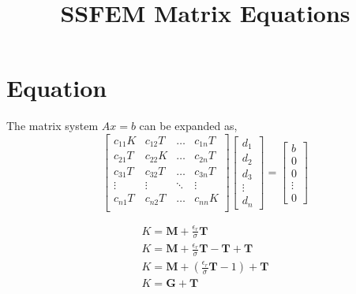 \documentclass[]{article}
\newcommand{\mat}[1]{\mathbf{#1}}
\begin{document}
 

\title{SSFEM Matrix Equations}
\maketitle

\section{Equation}
	The matrix system $Ax = b$ can be expanded as,
	\begin{equation}
		\begin{bmatrix}
			c_{11}K & c_{12}T & \ldots & c_{1n}T\\
			c_{21}T & c_{22}K & \ldots & c_{2n}T\\
			c_{31}T & c_{32}T & \ldots & c_{3n}T\\
			\vdots & \vdots  & \ddots & \vdots \\
			c_{n1}T & c_{n2}T & \ldots & c_{nn}K\\
		\end{bmatrix}
		\begin{bmatrix}
			d_1\\d_2\\d_3\\\vdots\\d_n
		\end{bmatrix}
		=
		\begin{bmatrix}
			b\\0\\0\\\vdots\\0
		\end{bmatrix}
	\end{equation}

	\begin{align}
	K = \mat{M} + \frac{\epsilon_r}{\sigma}\mat{T}\\
	K = \mat{M} + \frac{\epsilon_r}{\sigma}\mat{T} - \mat{T} + \mat{T}\\
	K = \mat{M} + \left(\frac{\epsilon_r}{\sigma}\mat{T}-1\right)+ \mat{T}\\
	K = \mat{G} + \mat{T}
	\end{align}
\end{document}
